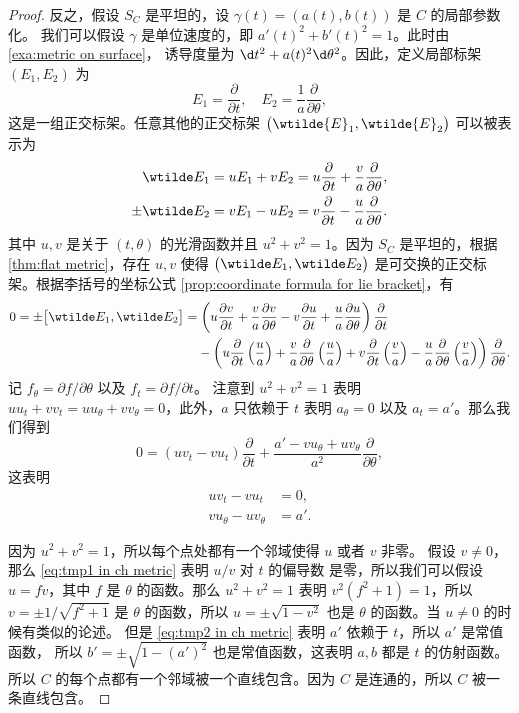 \begin{proof}
  反之，假设 $S_C$ 是平坦的，设 $\gamma(t)=(a(t),b(t))$ 是 $C$ 的局部参数化。
  我们可以假设 $\gamma$ 是单位速度的，即 $a'(t)^2+b'(t)^2=1$。此时由 \autoref{exa:metric on surface}，
  诱导度量为 $\d t^2+a(t)^2\d\theta^2$。因此，定义局部标架 $(E_1,E_2)$ 为
  \[
    E_1=\frac{\partial}{\partial t},\quad E_2=\frac{1}{a}\frac{\partial}{\partial\theta},
  \]
  这是一组正交标架。任意其他的正交标架 $\bigl(\wtilde{E}_1,\wtilde{E}_2\bigr)$ 可以被表示为
  \begin{align*}
    \wtilde E_1&=uE_1+vE_2=u\frac{\partial}{\partial t}+\frac{v}{a}\frac{\partial}{\partial\theta},\\
    \pm\wtilde E_2&=vE_1-uE_2=v\frac{\partial}{\partial t}-\frac{u}{a}\frac{\partial}{\partial\theta}.
  \end{align*}
  其中 $u,v$ 是关于 $(t,\theta)$ 的光滑函数并且 $u^2+v^2=1$。因为 $S_C$ 是平坦的，根据 
  \autoref{thm:flat metric}，存在 $u,v$ 使得 $\bigl(\wtilde E_1,\wtilde E_2\bigr)$
  是可交换的正交标架。根据李括号的坐标公式 \ref{prop:coordinate formula for lie bracket}，有
  \begin{align*}
    0=\pm \bigl[\wtilde E_1,\wtilde E_2\bigr]&=
    \left(u\frac{\partial v}{\partial t}+\frac{v}{a}\frac{\partial v}{\partial\theta}
    -v\frac{\partial u}{\partial t}+\frac{u}{a}\frac{\partial u}{\partial\theta}
    \right)\frac{\partial}{\partial t}\\
    &\hphantom{{}=}-\left(
      u\frac{\partial}{\partial t}\left(\frac{u}{a}\right)+\frac{v}{a}\frac{\partial}{\partial \theta}\left(\frac{u}{a}\right)
      +v\frac{\partial}{\partial t}\left(\frac{v}{a}\right)-\frac{u}{a}\frac{\partial}{\partial \theta}\left(\frac{v}{a}\right)
    \right)\frac{\partial}{\partial \theta}.
  \end{align*}
  记 $f_\theta=\partial f/\partial\theta$ 以及 $f_t=\partial f/\partial t$。
  注意到 $u^2+v^2=1$ 表明 $uu_t+vv_t=uu_\theta+vv_\theta=0$，此外，$a$ 只依赖于
  $t$ 表明 $a_\theta=0$ 以及 $a_t=a'$。那么我们得到
  \[
    0=(uv_t-vu_t)\frac{\partial}{\partial t}+\frac{a'-vu_\theta+uv_\theta}{a^2}
    \frac{\partial}{\partial\theta},
  \]
  这表明
  \begin{align}
    uv_t-vu_t&=0,\label{eq:tmp1 in ch metric}\\
    vu_\theta-uv_\theta&=a'\label{eq:tmp2 in ch metric}.
  \end{align}

  因为 $u^2+v^2=1$，所以每个点处都有一个邻域使得 $u$ 或者 $v$ 非零。
  假设 $v\neq 0$，那么 \eqref{eq:tmp1 in ch metric} 表明 $u/v$ 对 $t$ 的偏导数
  是零，所以我们可以假设 $u=fv$，其中 $f$ 是 $\theta$ 的函数。那么 $u^2+v^2=1$
  表明 $v^2(f^2+1)=1$，所以 $v=\pm 1/\sqrt{f^2+1}$ 是 $\theta$ 的函数，所以
  $u=\pm\sqrt{1-v^2}$ 也是 $\theta$ 的函数。当 $u\neq 0$ 的时候有类似的论述。
  但是 \eqref{eq:tmp2 in ch metric} 表明 $a'$ 依赖于 $t$，所以 $a'$ 是常值函数，
  所以 $b'=\pm\sqrt{1-(a')^2}$ 也是常值函数，这表明 $a,b$ 都是 $t$ 的仿射函数。
  所以 $C$ 的每个点都有一个邻域被一个直线包含。因为 $C$ 是连通的，所以 $C$
  被一条直线包含。 
\end{proof}


